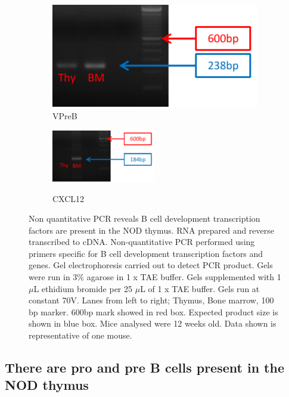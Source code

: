 \begin{figure}
	\begin{subfigure}{0.5\textwidth}
	\centering
	\caption{VPreB}
	\includegraphics[width=\textwidth]{Figures/VPreB.pdf}
	\end{subfigure}
	\begin{subfigure}{\textwidth}
	\caption{CXCL12}
	\includegraphics[width=0.5\textwidth]{Figures/CXCL12.pdf}
	\label{subfig:CXCL12}
	\end{subfigure}
\caption[Non quantitative PCR reveals B cell development transcription factors are present in the NOD thymus]{Non quantitative PCR reveals B cell development transcription factors are present in the NOD thymus.
RNA prepared and reverse transcribed to cDNA.
Non-quantitative PCR performed using primers specific for B cell development transcription factors and genes.
Gel electrophoresis carried out to detect PCR product.
Gels were run in 3\% agarose in 1 x TAE buffer. Gels supplemented with 1 $\mu$L ethidium bromide per 25 $\mu$L of 1 x TAE buffer. Gels run at constant 70V.
Lanes from left to right; Thymus, Bone marrow, 100 bp marker. 
600bp mark showed in red box.
Expected product size is shown in blue box.
Mice analysed were 12 weeks old.
Data shown is representative of one mouse. }
\label{fig:gels}
\end{figure}


\subsection{There are pro and pre B cells present in the NOD thymus}
\label{subsec:proandpre}

